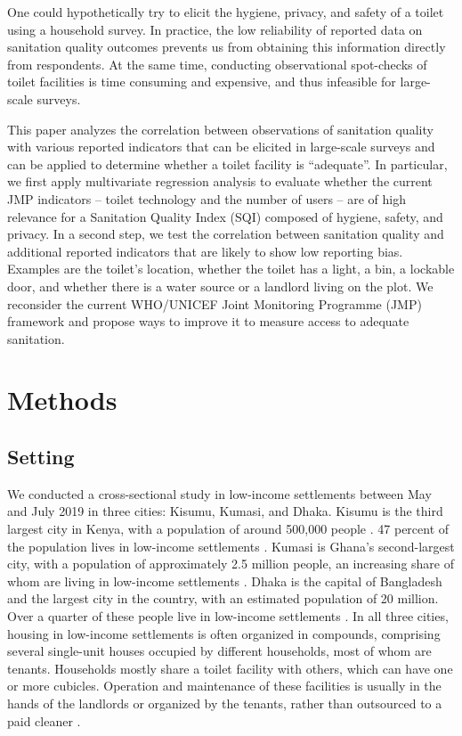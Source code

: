 \documentclass[natbib]{svjour3}                     %
\begin{document}
One could hypothetically try to elicit the hygiene, privacy, and safety of a toilet using a household survey. In practice, the low reliability of reported data on sanitation quality outcomes prevents us from obtaining this information directly from respondents. At the same time, conducting observational spot-checks of toilet facilities is time consuming and expensive, and thus infeasible for large-scale surveys. 

This paper analyzes the correlation between observations of sanitation quality with various reported indicators that can be elicited in large-scale surveys and can be applied to determine whether a toilet facility is “adequate”. In particular, we first apply multivariate regression analysis to evaluate whether the current JMP indicators -- toilet technology and the number of users -- are of high relevance for a Sanitation Quality Index (SQI) composed of hygiene, safety, and privacy. In a second step, we test the correlation between sanitation quality and additional reported indicators that are likely to show low reporting bias. Examples are the toilet’s location, whether the toilet has a light, a bin, a lockable door, and whether there is a water source or a landlord living on the plot. We reconsider the current WHO/UNICEF Joint Monitoring Programme (JMP) framework and propose ways to improve it to measure access to adequate sanitation. 
\section{Methods}
\label{sec:methods}
%
\subsection{Setting}
\label{sec:setting}
We conducted a cross-sectional study in low-income settlements between May and July 2019 in three cities: Kisumu, Kumasi, and Dhaka. Kisumu is the third largest city in Kenya, with a population of around 500,000 people \citep{KenyaNationalBureauofStatistics2019}. 47 percent of the population lives in low-income settlements \citep{NCPD2013}. Kumasi is Ghana's second-largest city, with a population of approximately 2.5 million people, an increasing share of whom are living in low-income settlements \citep{Amoako2011}. Dhaka is the capital of Bangladesh and the largest city in the country, with an estimated population of 20 million. Over a quarter of these people live in low-income settlements \citep{BangladeshBureauofStatistsics2019}. In all three cities, housing in low-income settlements is often organized in compounds, comprising several single-unit houses occupied by different households, most of whom are tenants. Households mostly share a toilet facility with others, which can have one or more cubicles. Operation and maintenance of these facilities is usually in the hands of the landlords or organized by the tenants, rather than outsourced to a paid cleaner \citep{Alam2017, Simiyu2017b, Antwi-Agyei2020}.
%
\FloatBarrier
%
\end{document}
